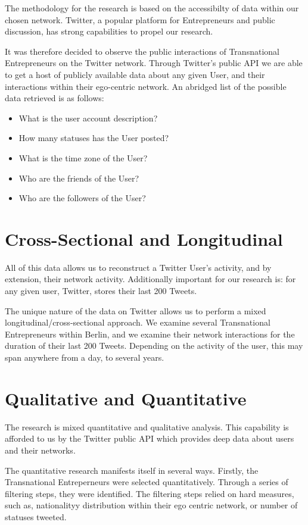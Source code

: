 The methodology for the research is based on the accessibilty of data
within our chosen network. Twitter, a popular platform for
Entrepreneurs and public discussion, has strong capabilities to propel
our research.

It was therefore decided to observe the public interactions of
Transnational Entrepreneurs on the Twitter network. Through Twitter's
public API we are able to get a host of publicly available data about
any given User, and their interactions within their ego-centric
network. An abridged list of the possible data retrieved is as follows:

\begin{itemize}
\item What is the user account description?
\item How many statuses has the User posted?
\item What is the time zone of the User?
\item Who are the friends of the User?
\item Who are the followers of the User?
\end{itemize}

\section{Cross-Sectional and Longitudinal}
All of this data allows us to reconstruct a Twitter User's activity,
and by extension, their network activity. Additionally important for
our research is: for any given user, Twitter, stores their last
200 Tweets.

The unique nature of the data on Twitter allows us to perform a mixed
longitudinal/cross-sectional approach. We examine several
Transnational Entrepreneurs within Berlin, and we examine their
network interactions for the duration of their last 200
Tweets. Depending on the activity of the user, this may span anywhere
from a day, to several years.

\section{Qualitative and Quantitative}
The research is mixed quantitative and qualitative analysis. This
capability is afforded to us by the Twitter public API which provides
deep data about users and their networks.

The quantitative research manifests itself in several ways. Firstly,
the Transnational Entreperneurs were selected quantitatively. Through
a series of filtering steps, they were identified. The filtering steps
relied on hard measures, such as, nationalityy distribution within
their ego centric network, or number of statuses tweeted.

